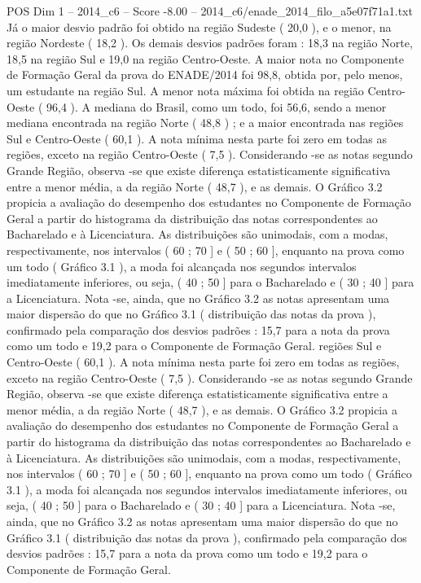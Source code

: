 \begin{textsample}{POS Dim 1 – 2014\_c6 – Score -8.00 – 2014\_c6/enade\_2014\_filo\_a5e07f71a1.txt}
Já o maior desvio padrão foi obtido na região Sudeste ( 20,0 ), e o menor, na região Nordeste ( 18,2 ).
Os demais desvios padrões foram : 18,3 na região Norte, 18,5 na região Sul e 19,0 na região Centro-Oeste.
A maior nota no Componente de Formação Geral da prova do ENADE/2014 foi 98,8, obtida por, pelo menos, um estudante na região Sul.
A menor nota máxima foi obtida na região Centro-Oeste ( 96,4 ).
A mediana do Brasil, como um todo, foi 56,6, sendo a menor mediana encontrada na região Norte ( 48,8 ) ; e a maior encontrada nas regiões Sul e Centro-Oeste ( 60,1 ).
A nota mínima nesta parte foi zero em todas as regiões, exceto na região Centro-Oeste ( 7,5 ).
Considerando -se as notas segundo Grande Região, observa -se que existe diferença estatisticamente significativa entre a menor média, a da região Norte ( 48,7 ), e as demais.
O Gráfico 3.2 propicia a avaliação do desempenho dos estudantes no Componente de Formação Geral a partir do histograma da distribuição das notas correspondentes ao Bacharelado e à Licenciatura.
As distribuições são unimodais, com a modas, respectivamente, nos intervalos ( 60 ; 70 ] e ( 50 ; 60 ], enquanto na prova como um todo ( Gráfico 3.1 ), a moda foi alcançada nos segundos intervalos imediatamente inferiores, ou seja, ( 40 ; 50 ] para o Bacharelado e ( 30 ; 40 ] para a Licenciatura.
Nota -se, ainda, que no Gráfico 3.2 as notas apresentam uma maior dispersão do que no Gráfico 3.1 ( distribuição das notas da prova ), confirmado pela comparação dos desvios padrões : 15,7 para a nota da prova como um todo e 19,2 para o Componente de Formação Geral. regiões Sul e Centro-Oeste ( 60,1 ).
A nota mínima nesta parte foi zero em todas as regiões, exceto na região Centro-Oeste ( 7,5 ).
Considerando -se as notas segundo Grande Região, observa -se que existe diferença estatisticamente significativa entre a menor média, a da região Norte ( 48,7 ), e as demais.
O Gráfico 3.2 propicia a avaliação do desempenho dos estudantes no Componente de Formação Geral a partir do histograma da distribuição das notas correspondentes ao Bacharelado e à Licenciatura.
As distribuições são unimodais, com a modas, respectivamente, nos intervalos ( 60 ; 70 ] e ( 50 ; 60 ], enquanto na prova como um todo ( Gráfico 3.1 ), a moda foi alcançada nos segundos intervalos imediatamente inferiores, ou seja, ( 40 ; 50 ] para o Bacharelado e ( 30 ; 40 ] para a Licenciatura.
Nota -se, ainda, que no Gráfico 3.2 as notas apresentam uma maior dispersão do que no Gráfico 3.1 ( distribuição das notas da prova ), confirmado pela comparação dos desvios padrões : 15,7 para a nota da prova como um todo e 19,2 para o Componente de Formação Geral.

\end{textsample}
